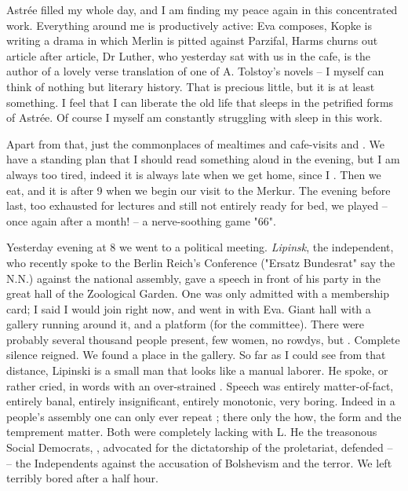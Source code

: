 
Astrée filled my whole day, and I am finding my peace again in this concentrated work. Everything around me is productively active: Eva composes, Kopke is writing a drama in which Merlin is pitted against Parzifal, Harms churns out article after article, Dr Luther, who yesterday sat with us in the cafe, is the author of a lovely verse translation of one of A. Tolstoy's novels -- I myself can think of nothing but literary history. That is precious little, but it is at least something. I feel that I can liberate the old life that sleeps in the petrified forms of Astrée. Of course I myself am constantly struggling with sleep in this work.

Apart from that, just the commonplaces of mealtimes and cafe-visits and . We have a standing plan that I should read something aloud in the evening, but I am always too tired, indeed it is always late when we get home, since I . Then we eat, and it is after 9 when we begin our visit to the Merkur. The evening before last, too exhausted for lectures and still not entirely ready for bed, we played -- once again after a month! -- a nerve-soothing game "66".

Yesterday evening at 8 we went to a political meeting. \textit{Lipinsk}, the independent, who recently spoke to the Berlin Reich's Conference ("Ersatz Bundesrat" say the N.N.) against the national assembly, gave a speech in front of his party in the great hall of the Zoological Garden. One was only admitted with a membership card; I said I would join right now, and went in with Eva. Giant hall with a gallery running around it, and a platform (for the committee). There were probably several thousand people present, few women, no rowdys, but . Complete silence reigned. We found a place in the gallery. So far as I could see from that distance, Lipinski is a small man that looks like a manual laborer. He spoke, or rather cried, in  words with an over-strained . Speech was entirely matter-of-fact, entirely banal, entirely insignificant, entirely monotonic, very boring. Indeed in a people's assembly one can only ever repeat ; there only the how, the form and the temprement matter. Both were completely lacking with L. He  the treasonous  Social Democrats, , advocated for the dictatorship of the proletariat, defended --  -- the Independents against the accusation of Bolshevism and the terror. We left terribly bored after a half hour.

